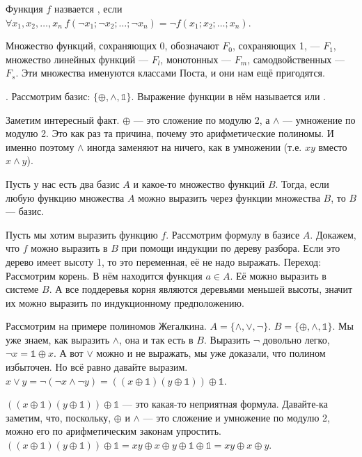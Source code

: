 \documentclass{article}
\begin{document}
\begin{itemize}
        \dfn Функция $f$ назвается , если $\forall x_1,x_2,\ldots,x_n~f(\neg x_1;\neg x_2;\ldots;\neg x_n)=\neg f(x_1;x_2;\ldots;x_n)$.
        \begin{Comment}
            Множество функций, сохраняющих 0, обозначают $F_0$, сохраняющих 1, --- $F_1$, множество линейных функций --- $F_l$, монотонных --- $F_m$, самодвойственных --- $F_s$. Эти множества именуются классами Поста, и они нам ещё пригодятся.
        \end{Comment}
        \dfn . Рассмотрим базис: $\{\oplus,\land,\mathbb1\}$. Выражение функции в нём называется  или .
        \begin{Comment}
            Заметим интересный факт. $\oplus$ --- это сложение по модулю 2, а $\land$ --- умножение по модулю 2. Это как раз та причина, почему это арифметические полиномы. И именно поэтому $\land$ иногда заменяют на ничего, как в умножении (т.е. $xy$ вместо $x\land y$).
        \end{Comment}
        \thm Пусть у нас есть два базис $A$ и какое-то множество функций $B$. Тогда, если любую функцию множества $A$ можно выразить через функции множества $B$, то $B$ --- базис.
        \begin{Proof}
            Пусть мы хотим выразить функцию $f$. Рассмотрим формулу в базисе $A$. Докажем, что $f$ можно выразить в $B$ при помощи индукции по дереву разбора. Если это дерево имеет высоту 1, то это переменная, её не надо выражать. Переход: Рассмотрим корень. В нём находится функция $a\in A$. Её можно выразить в системе $B$. А все поддеревья корня являются деревьями меньшей высоты, значит их можно выразить по индукционному предположению.
        \end{Proof}
        \begin{Example}
            Рассмотрим на примере полиномов Жегалкина. $A=\{\land,\lor,\neg\}$. $B=\{\oplus,\land,\mathbb1\}$. Мы уже знаем, как выразить $\land$, она и так есть в $B$. Выразить $\neg$ довольно легко, $\neg x=\mathbb1\oplus x$. А вот $\lor$ можно и не выражать, мы уже доказали, что полином избыточен. Но всё равно давайте выразим. $x\lor y=\neg(\neg x\land\neg y)=((x\oplus\mathbb1)(y\oplus\mathbb1))\oplus\mathbb1$.
        \end{Example}
        \begin{Comment}
            $((x\oplus\mathbb1)(y\oplus\mathbb1))\oplus\mathbb1$ --- это какая-то неприятная формула. Давайте-ка заметим, что, поскольку, $\oplus$ и $\land$ --- это сложение и умножение по модулю 2, можно его по арифметическим законам упростить. $((x\oplus\mathbb1)(y\oplus\mathbb1))\oplus\mathbb1=xy\oplus x\oplus y\oplus\mathbb1\oplus\mathbb1=xy\oplus x\oplus y$.

\end{Comment}
\end{itemize}
\end{document}
